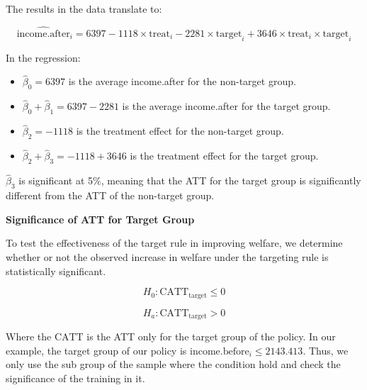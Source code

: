 \documentclass{article}
\begin{document}
The results in the data translate to:

$$
\hat{\text{income.after}}_i = 6397 - 1118 \times \text{treat}_i - 2281 \times \text{target}_i + 3646 \times \text{treat}_i \times \text{target}_i
$$

In the regression:
\begin{itemize}
    \item $\hat{\beta}_0 = 6397$ is the average income.after for the non-target group.
    \item $\hat{\beta}_0 + \hat{\beta}_1 = 6397 - 2281$ is the average income.after for the target group.
    \item $\hat{\beta}_2 = -1118$ is the treatment effect for the non-target group.
    \item $\hat{\beta}_2 + \hat{\beta}_3 = -1118 + 3646$ is the treatment effect for the target group. 
\end{itemize}

$\hat{\beta}_3$ is significant at 5\%, meaning that the ATT for the target group is significantly different from the ATT of the non-target group.

\textbf{Significance of ATT for Target Group}

To test the effectiveness of the target rule in improving welfare, we determine whether or not the observed increase in welfare under the targeting rule is statistically significant.

$$
H_0 : \text{CATT}_{\text{target}} \leq 0
$$

$$
H_a : \text{CATT}_{\text{target}} > 0
$$

Where the $\text{CATT}$ is the ATT only for the target group of the policy. In our example, the target group of our policy is $\text{income.before}_i \leq 2143.413$. Thus, we only use the sub group of the sample where the condition hold and check the significance of the training in it.
\end{document}
